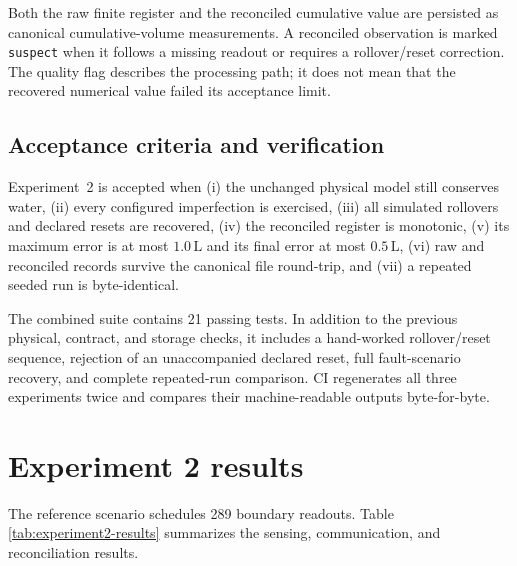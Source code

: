 \documentclass[11pt,a4paper]{article}
\begin{document}
Both the raw finite register and the reconciled cumulative value are persisted
as canonical cumulative-volume measurements. A reconciled observation is
marked \texttt{suspect} when it follows a missing readout or requires a
rollover/reset correction. The quality flag describes the processing path; it
does not mean that the recovered numerical value failed its acceptance limit.

\subsection{Acceptance criteria and verification}
Experiment~2 is accepted when (i) the unchanged physical model still conserves
water, (ii) every configured imperfection is exercised, (iii) all simulated
rollovers and declared resets are recovered, (iv) the reconciled register is
monotonic, (v) its maximum error is at most $1.0\,\mathrm{L}$ and its final
error at most $0.5\,\mathrm{L}$, (vi) raw and reconciled records survive the
canonical file round-trip, and (vii) a repeated seeded run is byte-identical.

The combined suite contains 21 passing tests. In addition to the previous
physical, contract, and storage checks, it includes a hand-worked rollover/reset
sequence, rejection of an unaccompanied declared reset, full fault-scenario
recovery, and complete repeated-run comparison. CI regenerates all three
experiments twice and compares their machine-readable outputs byte-for-byte.

\section{Experiment 2 results}
The reference scenario schedules 289 boundary readouts. Table~
\ref{tab:experiment2-results} summarizes the sensing, communication, and
reconciliation results.
\end{document}
